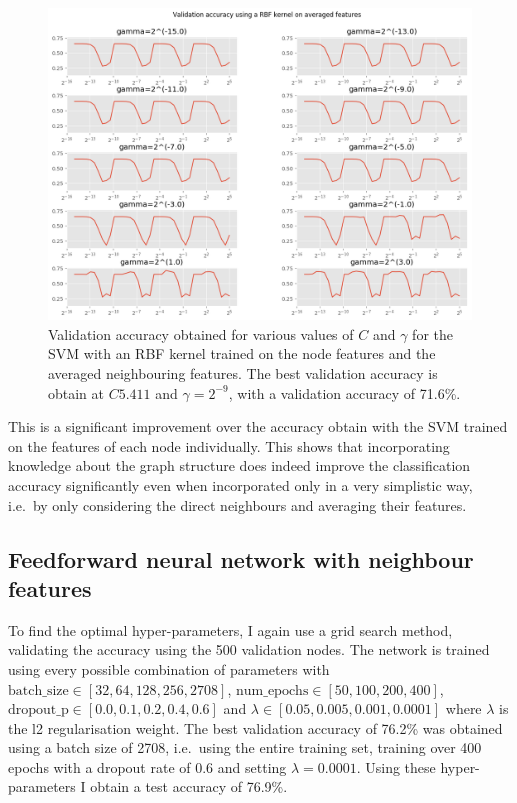 \documentclass[12pt]{article}
\theoremstyle{definition}
\begin{document}
\begin{figure}[h]
	\includegraphics[width=1.0\textwidth]{average_svm/rbf_reg}
	\centering
	\caption{Validation accuracy obtained for various values of $C$ and $\gamma$ for the SVM with an RBF kernel trained on the node features and the averaged neighbouring features. The best validation accuracy is obtain at $C5.411$ and $\gamma=2^{-9}$, with a validation accuracy of 71.6\%.}
	\label{fig/average_svm_rbf_reg}
\end{figure}

This is a significant improvement over the accuracy obtain with the SVM trained on the features of each node individually. This shows that incorporating knowledge about the graph structure does indeed improve the classification accuracy significantly even when incorporated only in a very simplistic way, i.e.\ by only considering the direct neighbours and averaging their features.

\subsection{Feedforward neural network with neighbour features}
To find the optimal hyper-parameters, I again use a grid search method, validating the accuracy using the 500 validation nodes. The network is trained using every possible combination of parameters with $\textrm{batch\_size} \in [32, 64, 128, 256, 2708]$, $\textrm{num\_epochs} \in  [50, 100, 200, 400]$, $\textrm{dropout\_p} \in  [0.0, 0.1, 0.2, 0.4, 0.6]$ and $\lambda \in  [0.05, 0.005, 0.001, 0.0001]$ where $\lambda$ is the l2 regularisation weight. The best validation accuracy of 76.2\% was obtained using a batch size of 2708, i.e.\ using the entire training set, training over 400 epochs with a dropout rate of 0.6 and setting $\lambda = 0.0001$. Using these hyper-parameters I obtain a test accuracy of 76.9\%.
\end{document}

